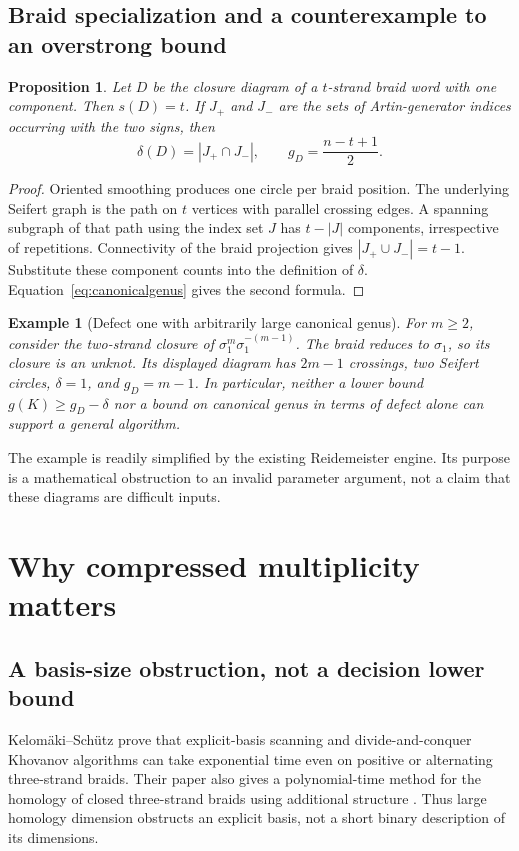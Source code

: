 \documentclass[11pt,letterpaper]{article}
\newtheorem{proposition}[theorem]{Proposition}
\newtheorem{example}[theorem]{Example}
\begin{document}
\subsection{Braid specialization and a counterexample to an overstrong bound}
\begin{proposition}\label{prop:braiddefect}
Let $D$ be the closure diagram of a $t$-strand braid word with one component.
Then $s(D)=t$. If $J_+$ and $J_-$ are the sets of Artin-generator indices
occurring with the two signs, then
\[
 \delta(D)=|J_+\cap J_-|,
 \qquad g_D=\frac{n-t+1}{2}.
\]
\end{proposition}
\begin{proof}
Oriented smoothing produces one circle per braid position. The underlying
Seifert graph is the path on $t$ vertices with parallel crossing edges.
A spanning subgraph of that path using the index set $J$ has $t-|J|$
components, irrespective of repetitions. Connectivity of the braid
projection gives $|J_+\cup J_-|=t-1$. Substitute these component counts into
the definition of $\delta$. Equation~\eqref{eq:canonicalgenus} gives the
second formula.
\end{proof}

\begin{example}[Defect one with arbitrarily large canonical genus]
\label{ex:defectone}
For $m\ge2$, consider the two-strand closure of
$\sigma_1^m\sigma_1^{-(m-1)}$. The braid reduces to $\sigma_1$, so its closure
is an unknot. Its displayed diagram has $2m-1$ crossings, two Seifert circles,
$\delta=1$, and $g_D=m-1$. In particular, neither a lower bound
$g(K)\ge g_D-\delta$ nor a bound on canonical genus in terms of defect alone
can support a general algorithm.
\end{example}

The example is readily simplified by the existing Reidemeister engine. Its
purpose is a mathematical obstruction to an invalid parameter argument,
not a claim that these diagrams are difficult inputs.



\section{Why compressed multiplicity matters}
\label{sec:barrier}

\subsection{A basis-size obstruction, not a decision lower bound}
Kelom\"aki--Sch\"utz prove that explicit-basis scanning and divide-and-conquer
Khovanov algorithms can take exponential time even on positive or alternating
three-strand braids. Their paper also gives a polynomial-time method for the
homology of closed three-strand braids using additional structure
\cite{kelomaki}. Thus large homology dimension obstructs an explicit basis,
not a short binary description of its dimensions.
\end{document}
